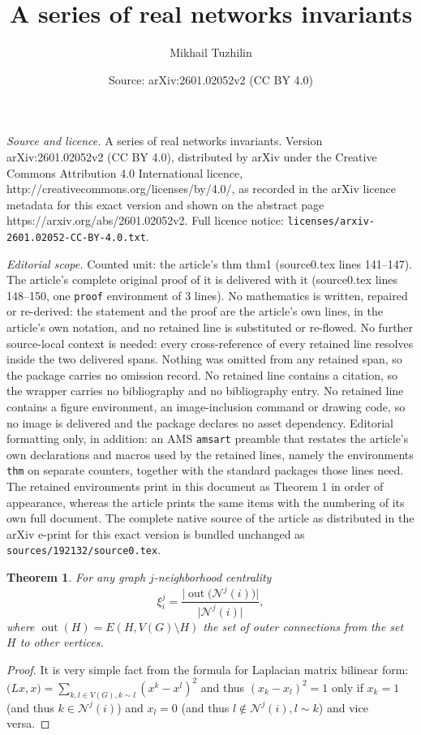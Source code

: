 \documentclass[10pt,a4paper]{amsart}
\title{A series of real networks invariants}
\author{Mikhail Tuzhilin}
\date{Source: arXiv:2601.02052v2 (CC BY 4.0)}
\newtheorem{thm}{Theorem}
\def \cN {\mathcal{N}}
\DeclareMathOperator{\out}{out}
\def \sumt {\sum\limits}
\begin{document}
\maketitle

\noindent\emph{Source and licence.} A series of real networks invariants. Version arXiv:2601.02052v2 (CC BY 4.0), distributed by arXiv under the Creative Commons Attribution 4.0 International licence, http://creativecommons.org/licenses/by/4.0/, as recorded in the arXiv licence metadata for this exact version and shown on the abstract page https://arxiv.org/abs/2601.02052v2. Full licence notice: \texttt{licenses/arxiv-2601.02052-CC-BY-4.0.txt}.\par\smallskip

\noindent\textit{Editorial scope.} Counted unit: the article's thm thm1 (source0.tex lines 141--147). The article's complete original proof of it is delivered with it (source0.tex lines 148--150, one \texttt{proof} environment of 3 lines). No mathematics is written, repaired or re-derived: the statement and the proof are the article's own lines, in the article's own notation, and no retained line is substituted or re-flowed.  No further source-local context is needed: every cross-reference of every retained line resolves inside the two delivered spans.  Nothing was omitted from any retained span, so the package carries no omission record.  No retained line contains a citation, so the wrapper carries no bibliography and no bibliography entry.  No retained line contains a figure environment, an image-inclusion command or drawing code, so no image is delivered and the package declares no asset dependency.  Editorial formatting only, in addition: an AMS \texttt{amsart} preamble that restates the article's own declarations and macros used by the retained lines, namely the environments \texttt{thm} on separate counters, together with the standard packages those lines need.  The retained environments print in this document as Theorem 1 in order of appearance, whereas the article prints the same items with the numbering of its own full document.  The complete native source of the article as distributed in the arXiv e-print for this exact version is bundled unchanged as \texttt{sources/192132/source0.tex}.
\begin{thm}\label{thm1}
    For any graph $j$-neighborhood centrality
    $$
        \xi^j_i = \frac {\big|\out\big(\cN^j(i)\big)\Big|} {\big|\cN^j(i)\big|},
    $$
    where $\out(H) = E(H, V(G)\setminus H)$ the set of outer connections from the set $H$ to other vertices.
\end{thm}

\begin{proof}
    It is very simple fact from the formula for Laplacian matrix bilinear form: $\big(L x, x\big) = \sumt_{k,l\in V(G), k\sim l}(x^k-x^l)^2$ and thus $(x_k-x_l)^2 = 1$ only if $x_k = 1$ (and thus $k\in \cN^j(i)$) and $x_l = 0$ (and thus $l\notin \cN^j(i), l\sim k$) and vice versa.
\end{proof}
\end{document}
